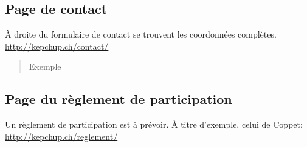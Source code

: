 \documentclass[letterpaper,10pt,english]{sphinxmanual}
\begin{document}
\subsection{Page de contact}
\label{configurer:page-de-contact}
À droite du formulaire de contact se trouvent les coordonnées complètes. \href{http://kepchup.ch/contact/}{http://kepchup.ch/contact/}
\begin{quote}\begin{description}
\item[{Exemple}] \leavevmode
{}

\end{description}\end{quote}


\subsection{Page du règlement de participation}
\label{configurer:page-du-reglement-de-participation}
Un règlement de participation est à prévoir. À titre d'exemple, celui de Coppet: \href{http://kepchup.ch/reglement/}{http://kepchup.ch/reglement/}
\end{document}
